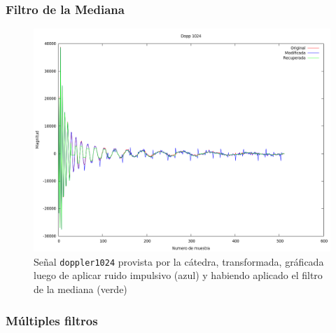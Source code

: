 \subsubsection{Filtro de la Mediana}

\begin{figure}[H]
\begin {center}
\includegraphics[width=500pt]{imagenes/dopp1024-imp-median.png}
\end {center}
\caption{Se\~nal \texttt{doppler1024} provista por la c\'atedra, transformada, gr\'aficada
luego de aplicar ruido impulsivo (azul) y 
habiendo aplicado el filtro de la mediana (verde)}
\label{fig:SinProm}
\end{figure}


\subsubsection{M\'ultiples filtros}

